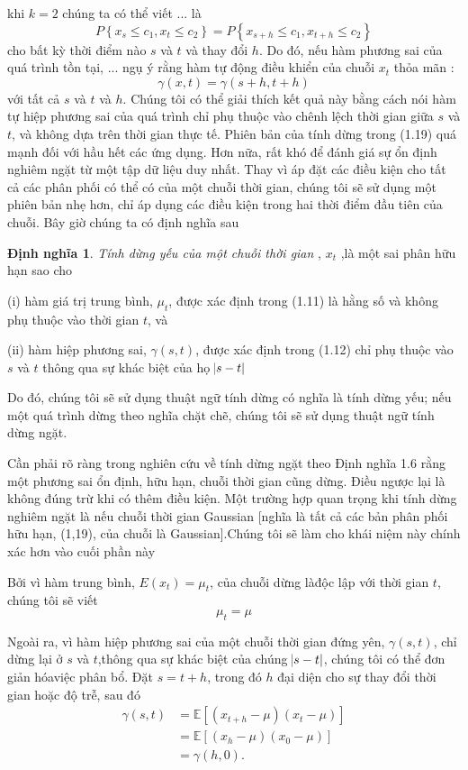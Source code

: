 \documentclass[12pt, a4paper,oneside]{book}
\theoremstyle{definition}
\newtheorem{dn}[theo]{Định nghĩa}
\def\E{\mathbb{ E}}
\begin{document}
khi $k=2$ chúng ta có thể viết ... là
$$P\left\lbrace x_{s}\le c_{1},x_{t}\le c_{2}\right\rbrace = P\left\lbrace x_{s+h}\le c_{1},x_{t+h}\le c_{2}\right\rbrace$$
cho bất kỳ thời điểm nào $ s $ và $ t $ và thay đổi $ h $. Do đó, nếu hàm phương sai của quá trình tồn tại, ... ngụ ý rằng hàm tự động điều khiển của chuỗi $x_{t}$ thỏa mãn :$$\gamma(x,t)=\gamma(s+h,t+h) $$
với tất cả $s$ và $t$ và $h$. Chúng tôi có thể giải thích kết quả này bằng cách nói hàm tự hiệp phương sai của quá trình chỉ phụ thuộc vào chênh lệch thời gian giữa $s$ và $t$, và không dựa trên thời gian thực tế. Phiên bản của tính dừng trong (1.19) quá mạnh đối với hầu hết các ứng dụng. Hơn nữa, rất khó để đánh giá sự ổn định nghiêm ngặt từ một tập dữ liệu duy nhất. Thay vì áp đặt các điều kiện cho tất cả các phân phối có thể có của một chuỗi thời gian, chúng tôi sẽ sử dụng một phiên bản nhẹ hơn, chỉ áp dụng các điều kiện trong hai thời điểm đầu tiên của chuỗi. Bây giờ chúng ta có định nghĩa sau
\begin{dn}	
	\textit{Tính dừng yếu của một chuỗi thời gian} , $x_{t}$ ,là một sai phân hữu hạn sao cho
	
	(i) hàm giá trị trung bình, $\mu_{t}$, được xác định trong (1.11) là hằng số và không phụ thuộc vào thời gian $t$, và
	
	(ii) hàm hiệp phương sai, $ \gamma(s, t)$, được xác định trong (1.12) chỉ phụ thuộc vào $s$ và $t$
	thông qua sự khác biệt của họ $ \abs{s-t} $
	
\end{dn}

Do đó, chúng tôi sẽ sử dụng thuật ngữ tính dừng có nghĩa là tính dừng yếu; nếu một quá trình dừng theo nghĩa chặt chẽ, chúng tôi sẽ sử dụng thuật ngữ tính dừng ngặt.

Cần phải rõ ràng trong nghiên cứu về tính dừng ngặt theo Định nghĩa 1.6 rằng một phương sai ổn định, hữu hạn, chuỗi thời gian cũng dừng. Điều ngược lại là không đúng trừ khi có thêm điều kiện. Một trường hợp quan trọng khi tính dừng nghiêm ngặt là nếu chuỗi thời gian Gaussian [nghĩa là tất cả các bản phân phối hữu hạn, (1,19), của chuỗi là Gaussian].Chúng tôi sẽ làm cho khái niệm này chính xác hơn vào cuối phần này

Bởi vì hàm trung bình, $E(x_{t})=\mu_{t}$, của chuỗi dừng làđộc lập với thời gian $t$, chúng tôi sẽ viết $$\mu_{t}=\mu$$

Ngoài ra, vì hàm hiệp phương sai của một chuỗi thời gian đứng yên, $ \gamma(s, t)$, chỉ dừng lại ở $s$ và $t$,thông qua sự khác biệt của chúng $ \abs{s-t} $, chúng tôi có thể đơn giản hóaviệc phân bổ. Đặt $s = t + h$, trong đó $h$ đại diện cho sự thay đổi thời gian hoặc độ trễ, sau đó
\begin{align*}
\gamma(s, t)&= \E[(x_{t+h}-\mu)(x_{t}-\mu)]\\
&=\E[(x_{h}-\mu)(x_{0}-\mu)]\\
&=\gamma(h,0).
\end{align*}
\end{document}
